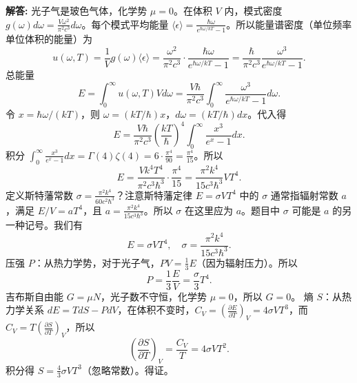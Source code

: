 \documentclass[12pt, a4paper, oneside]{ctexart}
\newenvironment{solution}{\par\noindent\textbf{解答:}\quad}{\par}
\begin{document}
\begin{solution}
    光子气是玻色气体，化学势 $\mu = 0$。在体积 $V$ 内，模式密度 $g(\omega) d\omega = \frac{V \omega^2}{\pi^2 c^3} d\omega$。每个模式平均能量 $\langle \epsilon \rangle = \frac{\hbar \omega}{e^{\hbar \omega / kT} - 1}$。所以能量谱密度（单位频率单位体积的能量）为
    \[
    u(\omega, T) = \frac{1}{V} g(\omega) \langle \epsilon \rangle = \frac{\omega^2}{\pi^2 c^3} \cdot \frac{\hbar \omega}{e^{\hbar \omega / kT} - 1} = \frac{\hbar}{\pi^2 c^3} \frac{\omega^3}{e^{\hbar \omega / kT} - 1}.
    \]
    总能量
    \[
    E = \int_0^\infty u(\omega, T) V d\omega = \frac{V \hbar}{\pi^2 c^3} \int_0^\infty \frac{\omega^3}{e^{\hbar \omega / kT} - 1} d\omega.
    \]
    令 $x = \hbar \omega / (kT)$，则 $\omega = (kT / \hbar) x$，$d\omega = (kT / \hbar) dx$。代入得
    \[
    E = \frac{V \hbar}{\pi^2 c^3} \left( \frac{kT}{\hbar} \right)^4 \int_0^\infty \frac{x^3}{e^x - 1} dx.
    \]
    积分 $\int_0^\infty \frac{x^3}{e^x - 1} dx = \Gamma(4) \zeta(4) = 6 \cdot \frac{\pi^4}{90} = \frac{\pi^4}{15}$。所以
    \[
    E = \frac{V k^4 T^4}{\pi^2 c^3 \hbar^3} \cdot \frac{\pi^4}{15} = \frac{\pi^2 k^4}{15 c^3 \hbar^3} V T^4.
    \]
    定义斯特藩常数 $\sigma = \frac{\pi^2 k^4}{60 c^2 \hbar^3}$？注意斯特藩定律 $E = \sigma V T^4$ 中的 $\sigma$ 通常指辐射常数 $a$，满足 $E/V = a T^4$，且 $a = \frac{\pi^2 k^4}{15 c^3 \hbar^3}$。所以 $\sigma$ 在这里应为 $a$。题目中 $\sigma$ 可能是 $a$ 的另一种记号。我们有
    \[
    E = \sigma V T^4, \quad \sigma = \frac{\pi^2 k^4}{15 c^3 \hbar^3}.
    \]
    压强 $P$：从热力学势，对于光子气，$PV = \frac{1}{3} E$（因为辐射压力）。所以
    \[
    P = \frac{1}{3} \frac{E}{V} = \frac{\sigma}{3} T^4.
    \]
    吉布斯自由能 $G = \mu N$，光子数不守恒，化学势 $\mu = 0$，所以 $G = 0$。
    熵 $S$：从热力学关系 $dE = T dS - P dV$，在体积不变时，$C_V = \left( \frac{\partial E}{\partial T} \right)_V = 4 \sigma V T^3$，而 $C_V = T \left( \frac{\partial S}{\partial T} \right)_V$，所以
    \[
    \left( \frac{\partial S}{\partial T} \right)_V = \frac{C_V}{T} = 4 \sigma V T^2.
    \]
    积分得 $S = \frac{4}{3} \sigma V T^3$（忽略常数）。得证。
\end{solution}
\end{document}
